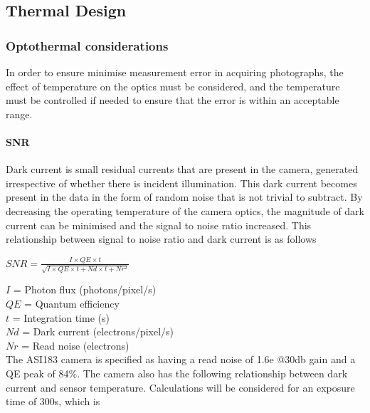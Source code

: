 \pagebreak
\subsection{Thermal Design} \label{Thermal_section}
\subsubsection{Optothermal considerations}

In order to ensure minimise measurement error in acquiring photographs, the effect of temperature on the optics must be considered, and the temperature must be controlled if needed to ensure that the error is within an acceptable range.\

\paragraph{SNR}

Dark current is small residual currents that are present in the camera, generated irrespective of whether there is incident illumination. This dark current becomes present in the data in the form of random noise that is not trivial to subtract. By decreasing the operating temperature of the camera optics, the magnitude of dark current can be minimised and the signal to noise ratio increased. This relationship between signal to noise ratio and dark current is as follows\\

\begin{center}
 $SNR =  \frac{I\times QE\times t}{\sqrt{I\times QE\times t+Nd\times t+Nr^2}}$\\
\end{center}

$I$ = Photon flux (photons/pixel/s)\\
$QE$ = Quantum efficiency\\
$t$ = Integration time (s)\\
$Nd$ = Dark current (electrons/pixel/s)\\
$Nr$ = Read noise (electrons)\\

The ASI183 camera is specified as having a read noise of 1.6e @30db gain and a QE peak of 84\%. The camera also has the following relationship between dark current and sensor temperature. Calculations will be considered for an exposure time of 300s, which is  \\


